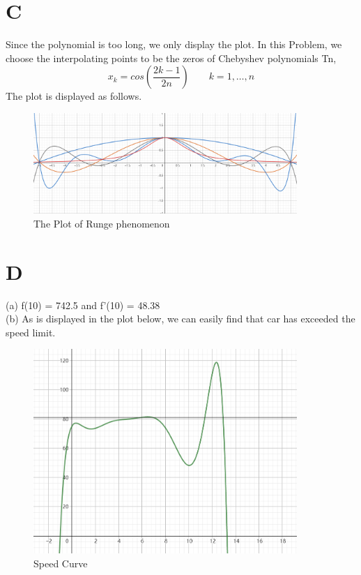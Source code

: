 \documentclass[UTF8]{ctexart}
\begin{document}
\section*{C}
\noindent Since the polynomial is too long, we only display the plot.
In this Problem, we choose the interpolating points to be the zeros of Chebyshev polynomials Tn,
$$x_k = cos\left(\frac{2k-1}{2n}\right) \qquad k = 1,\dots,n$$
The plot is displayed as follows.\\
\begin{figure}[htp]
    \centering
    \includegraphics[width=10cm]{PlotB}
    \caption{The Plot of Runge phenomenon}
    \label{fig:PlotC}
\end{figure}

\section*{D}
\noindent 
(a) f(10) = 742.5 and f'(10) = 48.38\\
(b) As is displayed in the plot below, we can easily find that car has exceeded the speed limit.\\
\begin{figure}[htp]
    \centering
    \includegraphics[width=10cm]{PlotD}
    \caption{Speed Curve}
    \label{fig:PlotD}
\end{figure}
\end{document}
